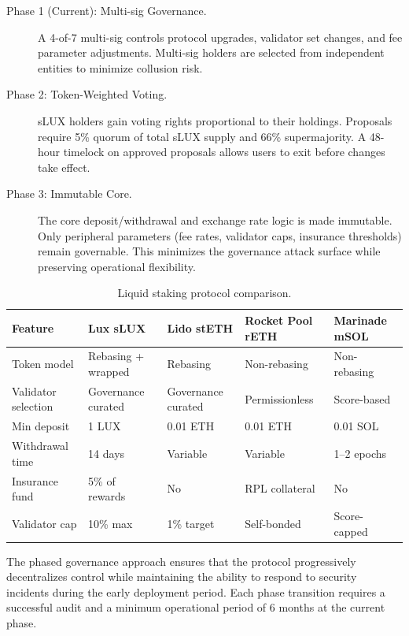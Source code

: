 \begin{description}
    \item[Phase 1 (Current): Multi-sig Governance.] A 4-of-7 multi-sig controls protocol upgrades, validator set changes, and fee parameter adjustments. Multi-sig holders are selected from independent entities to minimize collusion risk.

    \item[Phase 2: Token-Weighted Voting.] sLUX holders gain voting rights proportional to their holdings. Proposals require 5\% quorum of total sLUX supply and 66\% supermajority. A 48-hour timelock on approved proposals allows users to exit before changes take effect.

    \item[Phase 3: Immutable Core.] The core deposit/withdrawal and exchange rate logic is made immutable. Only peripheral parameters (fee rates, validator caps, insurance thresholds) remain governable. This minimizes the governance attack surface while preserving operational flexibility.
\end{description}

\begin{table}[H]
\centering
\caption{Liquid staking protocol comparison.}
\label{tab:lstcompare}
\begin{tabular}{p{2.5cm}p{2.3cm}p{2.3cm}p{2.3cm}p{2.3cm}}
\toprule
\textbf{Feature} & \textbf{Lux sLUX} & \textbf{Lido stETH} & \textbf{Rocket Pool rETH} & \textbf{Marinade mSOL} \\
\midrule
Token model & Rebasing + wrapped & Rebasing & Non-rebasing & Non-rebasing \\
Validator selection & Governance curated & Governance curated & Permissionless & Score-based \\
Min deposit & 1 LUX & 0.01 ETH & 0.01 ETH & 0.01 SOL \\
Withdrawal time & 14 days & Variable & Variable & 1--2 epochs \\
Insurance fund & 5\% of rewards & No & RPL collateral & No \\
Validator cap & 10\% max & 1\% target & Self-bonded & Score-capped \\
\bottomrule
\end{tabular}
\end{table}

The phased governance approach ensures that the protocol progressively decentralizes control while maintaining the ability to respond to security incidents during the early deployment period. Each phase transition requires a successful audit and a minimum operational period of 6 months at the current phase.


